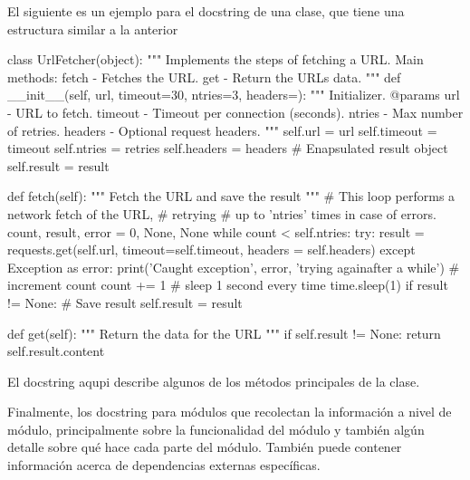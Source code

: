 El siguiente es un ejemplo para el docstring de una clase, que tiene una estructura similar a la anterior

\begin{VerbatimBold}
class UrlFetcher(object):
    """ Implements the steps of fetching a URL.
    Main methods:
    fetch - Fetches the URL.
    get - Return the URLs data.
    """
    def __init__(self, url, timeout=30, ntries=3, headers={}):
        """ Initializer.
        @params
            url - URL to fetch.
            timeout - Timeout per connection (seconds).
            ntries - Max number of retries.
            headers - Optional request headers.
        """
        self.url = url
        self.timeout = timeout
        self.ntries = retries
        self.headers = headers
        # Enapsulated result object
        self.result = result
    
    def fetch(self):
        """ Fetch the URL and save the result """
        # This loop performs a network fetch of the URL,
        # retrying
        # up to 'ntries' times in case of errors.
        count, result, error = 0, None, None
        while count < self.ntries:
            try:
                result = requests.get(self.url,
                timeout=self.timeout,
                headers = self.headers)
            except Exception as error:
                print('Caught exception', error, 'trying againafter a while')
                # increment count
                count += 1
                # sleep 1 second every time
                time.sleep(1)
            if result != None:
            # Save result
                self.result = result

    def get(self):
        """ Return the data for the URL """
        if self.result != None:
            return self.result.content
\end{VerbatimBold}

El docstring aqupi describe algunos de los métodos principales de la clase.

Finalmente, los docstring para módulos que recolectan la información a nivel de módulo, principalmente sobre la funcionalidad del módulo y también algún detalle sobre qué hace cada parte del módulo. También puede contener información acerca de dependencias externas específicas.


